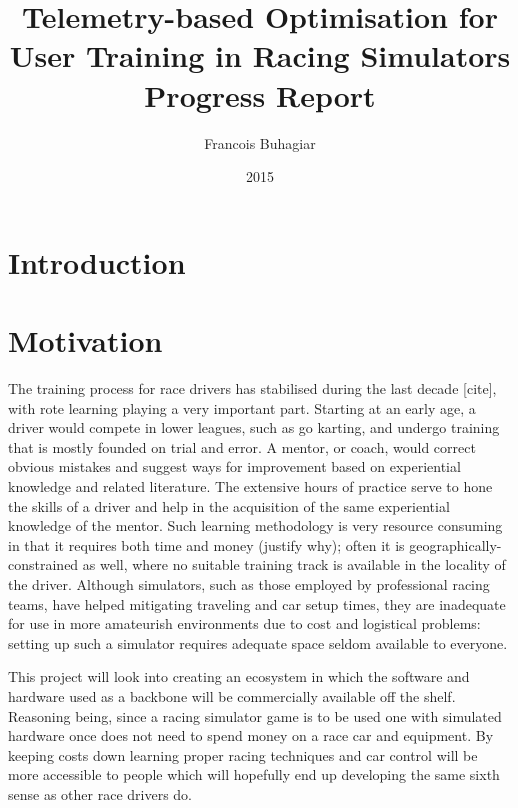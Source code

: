 \documentclass{article}
\title{Telemetry-based Optimisation for User Training in Racing Simulators \\ Progress Report}
\author{Francois Buhagiar}
\date{2015}
\begin{document}

\maketitle

\setcounter{page}{1}

\newpage
\begin{abstract}
\end{abstract}

\newpage
\section{Introduction}

\section{Motivation}
The training process for race drivers has stabilised during the last decade [cite], with rote learning playing a very important part. Starting at an early age, a driver would compete in lower leagues, such as go karting, and undergo training that is mostly founded on trial and error. A mentor, or coach, would correct obvious mistakes and suggest ways for improvement based on experiential knowledge and related literature. The extensive hours of practice serve to hone the skills of a driver and help in the acquisition of the same experiential knowledge of the mentor. Such learning methodology is very resource consuming in that it requires both time and money (justify why); often it is geographically-constrained as well, where no suitable training track is available in the locality of the driver. Although simulators, such as those employed by professional racing teams, have helped mitigating traveling and car setup times, they are inadequate for use in more amateurish environments due to cost and logistical problems: setting up such a simulator requires adequate space seldom available to everyone.

This project will look into creating an ecosystem in which the software and hardware used as a backbone will be commercially available off the shelf. Reasoning being, since a racing simulator game is to be used one with simulated hardware once does not need to spend money on a race car and equipment. By keeping costs down learning proper racing techniques and car control will be more accessible to people which will hopefully end up developing the same sixth sense as other race drivers do.
\end{document}
